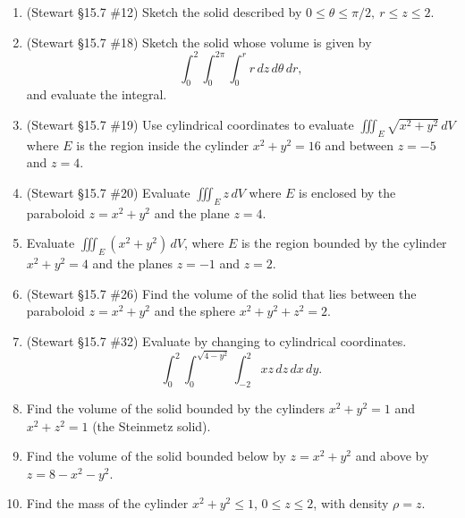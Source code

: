 \documentclass[12pt]{article}
\begin{document}
\begin{enumerate}
\begin{enumerate}
        \item (Stewart \S15.7 \#12) Sketch the solid described by $0 \leq \theta \leq \pi/2,\ r \leq z \leq 2$.
        \item (Stewart \S15.7 \#18) Sketch the solid whose volume is given by
        \[ \int_0^2 \int_0^{2\pi}\int_0^{r} r\,dz\,d\theta\,dr, \]
        and evaluate the integral.
        \item (Stewart \S15.7 \#19) Use cylindrical coordinates to evaluate $\iiint_E \sqrt{x^2+y^2}\,dV$ where $E$ is the region inside the cylinder $x^2 + y^2 = 16$ and between $z = -5$ and $z = 4$.
        \item (Stewart \S15.7 \#20) Evaluate $\iiint_E z\, dV$ where $E$ is enclosed by the paraboloid $z = x^2 + y^2$ and the plane $z = 4$.
        \item Evaluate $\iiint_{E} (x^2 + y^2) \, dV$, where $E$ is the region bounded by the cylinder $x^2 + y^2 = 4$ and the planes $z = -1$ and $z = 2$.
        \item (Stewart \S15.7 \#26) Find the volume of the solid that lies between the paraboloid $z = x^2 + y^2$ and the sphere $x^2 + y^2 + z^2 = 2$.
        \item (Stewart \S15.7 \#32) Evaluate by changing to cylindrical coordinates.
        \[ \int_0^2 \int_0^{\sqrt{4-y^2}}\int_{-2}^{2} xz\, dz\,dx\,dy. \]
        \item  Find the volume of the solid bounded by the cylinders $x^2+y^2=1$ and $x^2+z^2=1$ (the Steinmetz solid).
        \item Find the volume of the solid bounded below by $z=x^2+y^2$ and above by $z=8-x^2-y^2$.
        \item Find the mass of the cylinder $x^2+y^2\le 1$, $0\le z\le 2$, with density $\rho=z$.
    \end{enumerate}
\newpage


\end{enumerate}
\end{document}
